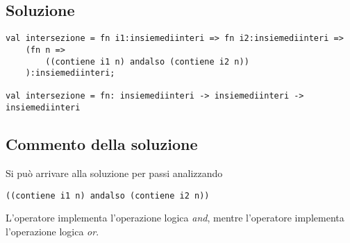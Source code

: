 \subsection{Soluzione}

\begin{lstlisting}[style = SML, caption = {Definizione della funzione \sml{intersezione}}]
val intersezione = fn i1:insiemediinteri => fn i2:insiemediinteri =>
	(fn n =>
		((contiene i1 n) andalso (contiene i2 n))
	):insiemediinteri;

val intersezione = fn: insiemediinteri -> insiemediinteri -> insiemediinteri
\end{lstlisting}

\subsection{Commento della soluzione}

Si può arrivare alla soluzione per passi analizzando

\begin{lstlisting}[style = SML]
((contiene i1 n) andalso (contiene i2 n))
\end{lstlisting}

L'operatore  implementa l'operazione logica \emph{and}, mentre l'operatore  implementa l'operazione logica \emph{or}.
